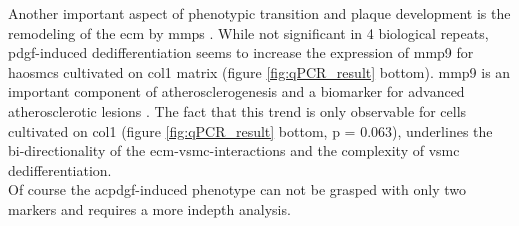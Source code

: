 Another important aspect of phenotypic transition and plaque development is the remodeling of the \ac{ecm} by \acp{mmp} \cite{johnsonMetalloproteinasesAtherosclerosis2017}. While not significant in 4 biological repeats, \ac{pdgf}-induced dedifferentiation seems to increase the expression of \ac{mmp9} for \acp{haosmc} cultivated on \ac{col1} matrix (figure \ref{fig:qPCR_result} bottom). \ac{mmp9} is an important component of atherosclerogenesis \cite{galisIncreasedExpressionMatrix1994} and a biomarker for advanced atherosclerotic lesions \cite{langleyExtracellularMatrixProteomics2017}. The fact that this trend is only observable for cells cultivated on \ac{col1} (figure \ref{fig:qPCR_result} bottom, p = 0.063), underlines the bi-directionality of the \ac{ecm}-\ac{vsmc}-interactions and the complexity of \ac{vsmc} dedifferentiation.\\
Of course the ac{pdgf}-induced phenotype can not be grasped with only two markers and requires a more indepth analysis.



